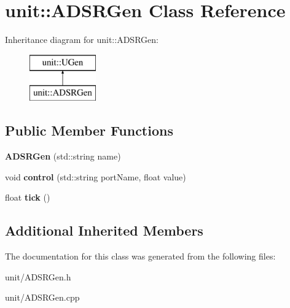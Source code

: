 \hypertarget{classunit_1_1ADSRGen}{}\section{unit\+:\+:A\+D\+S\+R\+Gen Class Reference}
\label{classunit_1_1ADSRGen}
Inheritance diagram for unit\+:\+:A\+D\+S\+R\+Gen\+:\begin{figure}[H]
\begin{center}
\leavevmode
\includegraphics[height=2.000000cm]{classunit_1_1ADSRGen}
\end{center}
\end{figure}
\subsection*{Public Member Functions}
\begin{DoxyCompactItemize}
\item 
{\bfseries A\+D\+S\+R\+Gen} (std\+::string name)\hypertarget{classunit_1_1ADSRGen_a7e2d63eecbe51fc86a93697dd4d47964}{}\label{classunit_1_1ADSRGen_a7e2d63eecbe51fc86a93697dd4d47964}

\item 
void {\bfseries control} (std\+::string port\+Name, float value)\hypertarget{classunit_1_1ADSRGen_ac43bddd25b9a84f0ad6b299ed55f5133}{}\label{classunit_1_1ADSRGen_ac43bddd25b9a84f0ad6b299ed55f5133}

\item 
float {\bfseries tick} ()\hypertarget{classunit_1_1ADSRGen_a91a149fa5065d94dccec224b18710a24}{}\label{classunit_1_1ADSRGen_a91a149fa5065d94dccec224b18710a24}

\end{DoxyCompactItemize}
\subsection*{Additional Inherited Members}


The documentation for this class was generated from the following files\+:\begin{DoxyCompactItemize}
\item 
unit/A\+D\+S\+R\+Gen.\+h\item 
unit/A\+D\+S\+R\+Gen.\+cpp\end{DoxyCompactItemize}
